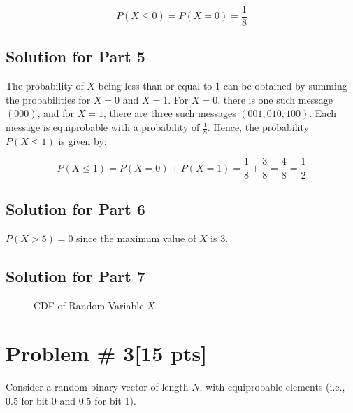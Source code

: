 \documentclass{article}
\begin{document}
\[
P(X \leq 0) = P(X=0) = \frac{1}{8}
\]

\subsection*{Solution for Part 5}
The probability of \(X\) being less than or equal to 1 can be obtained by summing the probabilities for \(X=0\) and \(X=1\). For \(X=0\), there is one such message \((000)\), and for \(X=1\), there are three such messages \((001, 010, 100)\). Each message is equiprobable with a probability of \(\frac{1}{8}\). Hence, the probability \(P(X \leq 1)\) is given by:

\[
P(X \leq 1) = P(X=0) + P(X=1) = \frac{1}{8} + \frac{3}{8} = \frac{4}{8} = \frac{1}{2}
\]


\subsection*{Solution for Part 6}
\(P(X > 5) = 0\) since the maximum value of \(X\) is 3.

\subsection*{Solution for Part 7}
\begin{figure}[h!]
  \centering
  \caption{CDF of Random Variable \(X\)}
\end{figure}


\newpage
\section*{Problem \# 3[15 pts]}
Consider a random binary vector of length \(N\), with equiprobable elements (i.e., 0.5 for bit 0 and 0.5 for bit 1).
\end{document}
